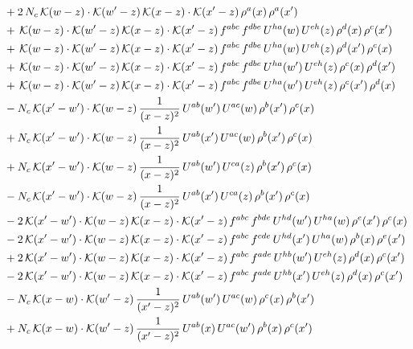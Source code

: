 \documentclass[10pt]{article}
\numberwithin{equation}{section}
\begin{document}
\begin{align}
&+2\,N_{c}\,\mathcal{K}(w-z)\cdot\mathcal{K}(w'-z)\,\mathcal{K}(x-z)\cdot\mathcal{K}(x'-z)\,\rho^{a}(x)\,\rho^{a}(x')\notag\\
&+\,\mathcal{K}(w-z)\cdot\mathcal{K}(w'-z)\,\mathcal{K}(x-z)\cdot\mathcal{K}(x'-z)\,f^{abc}\,f^{dbe}\,U^{ha}(w)\,U^{eh}(z)\,\rho^{d}(x)\,\rho^{c}(x')\notag\\
&+\,\mathcal{K}(w-z)\cdot\mathcal{K}(w'-z)\,\mathcal{K}(x-z)\cdot\mathcal{K}(x'-z)\,f^{abc}\,f^{dbe}\,U^{ha}(w)\,U^{eh}(z)\,\rho^{d}(x')\,\rho^{c}(x)\notag\\
&+\,\mathcal{K}(w-z)\cdot\mathcal{K}(w'-z)\,\mathcal{K}(x-z)\cdot\mathcal{K}(x'-z)\,f^{abc}\,f^{dbe}\,U^{ha}(w')\,U^{eh}(z)\,\rho^{c}(x)\,\rho^{d}(x')\notag\\
&+\,\mathcal{K}(w-z)\cdot\mathcal{K}(w'-z)\,\mathcal{K}(x-z)\cdot\mathcal{K}(x'-z)\,f^{abc}\,f^{dbe}\,U^{ha}(w')\,U^{eh}(z)\,\rho^{c}(x')\,\rho^{d}(x)\notag\\
&-N_{c}\,\mathcal{K}(x'-w')\cdot\mathcal{K}(w-z)\,\frac{1}{(x-z)^{2}}\,U^{ab}(w')\,U^{ac}(w)\,\rho^{b}(x')\,\rho^{c}(x)\notag\\
&+N_{c}\,\mathcal{K}(x'-w')\cdot\mathcal{K}(w-z)\,\frac{1}{(x-z)^{2}}\,U^{ab}(x')\,U^{ac}(w)\,\rho^{b}(x')\,\rho^{c}(x)\notag\\
&+N_{c}\,\mathcal{K}(x'-w')\cdot\mathcal{K}(w-z)\,\frac{1}{(x-z)^{2}}\,U^{ab}(w')\,U^{ca}(z)\,\rho^{b}(x')\,\rho^{c}(x)\notag\\
&-N_{c}\,\mathcal{K}(x'-w')\cdot\mathcal{K}(w-z)\,\frac{1}{(x-z)^{2}}\,U^{ab}(x')\,U^{ca}(z)\,\rho^{b}(x')\,\rho^{c}(x)\notag\\
&-2\,\mathcal{K}(x'-w')\cdot\mathcal{K}(w-z)\,\mathcal{K}(x-z)\cdot\mathcal{K}(x'-z)\,f^{abc}\,f^{bde}\,U^{hd}(w')\,U^{ha}(w)\,\rho^{e}(x')\,\rho^{c}(x)\notag\\
&-2\,\mathcal{K}(x'-w')\cdot\mathcal{K}(w-z)\,\mathcal{K}(x-z)\cdot\mathcal{K}(x'-z)\,f^{abc}\,f^{cde}\,U^{hd}(x')\,U^{ha}(w)\,\rho^{b}(x)\,\rho^{e}(x')\notag\\
&+2\,\mathcal{K}(x'-w')\cdot\mathcal{K}(w-z)\,\mathcal{K}(x-z)\cdot\mathcal{K}(x'-z)\,f^{abc}\,f^{ade}\,U^{hb}(w')\,U^{eh}(z)\,\rho^{d}(x)\,\rho^{c}(x')\notag\\
&-2\,\mathcal{K}(x'-w')\cdot\mathcal{K}(w-z)\,\mathcal{K}(x-z)\cdot\mathcal{K}(x'-z)\,f^{abc}\,f^{ade}\,U^{hb}(x')\,U^{eh}(z)\,\rho^{d}(x)\,\rho^{c}(x')\notag\\
&-N_{c}\,\mathcal{K}(x-w)\cdot\mathcal{K}(w'-z)\,\frac{1}{(x'-z)^{2}}\,U^{ab}(w')\,U^{ac}(w)\,\rho^{c}(x)\,\rho^{b}(x')\notag \\ & +N_{c}\,\mathcal{K}(x-w)\cdot\mathcal{K}(w'-z)\,\frac{1}{(x'-z)^{2}}\,U^{ab}(x)\,U^{ac}(w')\,\rho^{b}(x)\,\rho^{c}(x')\notag\\

\end{align}
\end{document}
